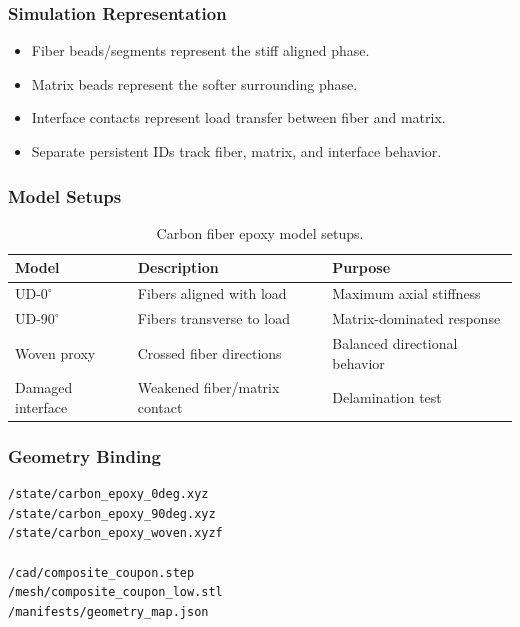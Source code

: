 \documentclass[12pt]{article}
\begin{document}
\subsubsection*{Simulation Representation}

\begin{itemize}[noitemsep]
	\item Fiber beads/segments represent the stiff aligned phase.
	\item Matrix beads represent the softer surrounding phase.
	\item Interface contacts represent load transfer between fiber and matrix.
	\item Separate persistent IDs track fiber, matrix, and interface behavior.
\end{itemize}

\subsubsection*{Model Setups}

\begin{table}[H]
\centering
\caption{Carbon fiber epoxy model setups.}
\label{tab:cfe_setups}
\begin{tabular}{p{}p{}p{}}
\toprule
\textbf{Model} & \textbf{Description} & \textbf{Purpose} \\
\midrule
UD-$0^\circ$      & Fibers aligned with load     & Maximum axial stiffness \\
UD-$90^\circ$     & Fibers transverse to load    & Matrix-dominated response \\
Woven proxy       & Crossed fiber directions     & Balanced directional behavior \\
Damaged interface & Weakened fiber/matrix contact & Delamination test \\
\bottomrule
\end{tabular}
\end{table}

\subsubsection*{Geometry Binding}

\begin{verbatim}
/state/carbon_epoxy_0deg.xyz
/state/carbon_epoxy_90deg.xyz
/state/carbon_epoxy_woven.xyzf

/cad/composite_coupon.step
/mesh/composite_coupon_low.stl
/manifests/geometry_map.json
\end{verbatim}
\end{document}
